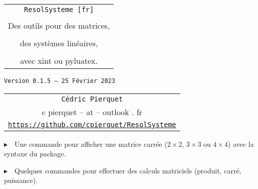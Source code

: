 \documentclass[french,a4paper,11pt]{article}
\def\TPversion{0.1.5}
\def\TPdate{25 Février 2023}
\begin{document}
\setlength{\aweboxleftmargin}{0.07\linewidth}
\setlength{\aweboxcontentwidth}{0.93\linewidth}
\setlength{\aweboxvskip}{8pt}

\pagestyle{fancy}

\thispagestyle{empty}

\vspace{2cm}

\begin{center}
	\begin{minipage}{0.75\linewidth}
	\begin{tcolorbox}[colframe=yellow,colback=yellow!15]
		\begin{center}
			\begin{tabular}{c}
				{\Huge \texttt{ResolSysteme [fr]}}\\
				\\
				{\LARGE Des outils pour des matrices, } \\
				\\
				{\LARGE des systèmes linéaires,} \\
				\\
				{\LARGE avec xint ou pyluatex.} \\
			\end{tabular}
			
			\bigskip
			
			{\small \texttt{Version \TPversion{} -- \TPdate}}
		\end{center}
	\end{tcolorbox}
\end{minipage}
\end{center}

\begin{center}
	\begin{tabular}{c}
	\texttt{Cédric Pierquet}\\
	{\ttfamily c pierquet -- at -- outlook . fr}\\
	\texttt{\url{https://github.com/cpierquet/ResolSysteme}}
\end{tabular}
\end{center}

\vspace{0.25cm}

{$\blacktriangleright$~~Une commande pour afficher une matrice carrée ($2\times2$, $3\times3$ ou $4\times4$) avec la syntaxe du package.}

\smallskip

{$\blacktriangleright$~~Quelques commandes pour effectuer des calculs matriciels (produit, carré, puissance).}
\end{document}
